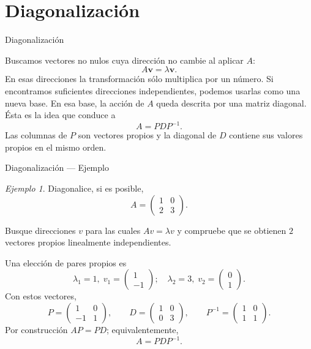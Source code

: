 \documentclass[aspectratio=169,11pt]{beamer}
\theoremstyle{remark}
\newtheorem{Ejem}[definicion]{Ejemplo}
\begin{document}
\section{Diagonalización}
\begin{frame}[allowframebreaks]{Diagonalización}
\footnotesize

Buscamos vectores no nulos cuya dirección no cambie al aplicar $A$:
\[
A\mathbf v=\lambda\mathbf v.
\]
En esas direcciones la transformación sólo multiplica por un número. Si encontramos suficientes direcciones independientes, podemos usarlas como una nueva base.
\medskip
En esa base, la acción de $A$ queda descrita por una matriz diagonal. Ésta es la idea que conduce a
\[
\boxed{A=PDP^{-1}}.
\]
Las columnas de $P$ son vectores propios y la diagonal de $D$ contiene sus valores propios en el mismo orden.
\end{frame}

\begin{frame}[shrink=5]{Diagonalización — Ejemplo}
\footnotesize
\begin{Ejem}

Diagonalice, si es posible,
\[
A=\begin{pmatrix}1 & 0\\2 & 3\end{pmatrix}.
\]

Busque direcciones $v$ para las cuales $Av=\lambda v$ y compruebe que se obtienen $2$ vectores propios linealmente independientes.

\scriptsize
Una elección de pares propios es
\[
\lambda_1=1,\;v_1=\begin{pmatrix}1\\-1\end{pmatrix};\quad \lambda_2=3,\;v_2=\begin{pmatrix}0\\1\end{pmatrix}.
\]
Con estos vectores,
\[
P=\begin{pmatrix}1 & 0\\-1 & 1\end{pmatrix},\qquad D=\begin{pmatrix}1 & 0\\0 & 3\end{pmatrix},\qquad P^{-1}=\begin{pmatrix}1 & 0\\1 & 1\end{pmatrix}.
\]
Por construcción $AP=PD$; equivalentemente,
\[
\boxed{A=PDP^{-1}}.
\]
\end{Ejem}
\end{frame}
\end{document}
